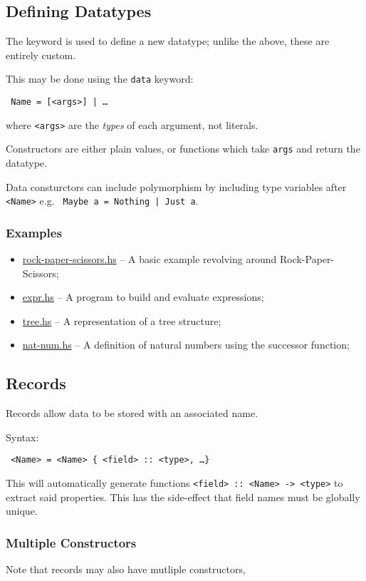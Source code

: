 \subsection{Defining Datatypes}
The  keyword is used to define a new datatype; unlike the above, these are entirely custom.

This may be done using the \texttt{data} keyword:
\begin{center}
  \texttt{ Name =  [<args>] | \ldots}
\end{center}
where \texttt{<args>} are the \textit{types} of each argument, not literals.

Constructors are either plain values, or functions which take \texttt{args} and return the datatype.

Data consturctors can include polymorphism by including type variables after \texttt{<Name>} e.g. \texttt{ Maybe a = Nothing | Just a}.

\subsubsection{Examples}
\begin{itemize}
  \item \url{rock-paper-scissors.hs} -- A basic example revolving around Rock-Paper-Scissors;
  \item \url{expr.hs} -- A program to build and evaluate expressions;
  \item \url{tree.hs} -- A representation of a tree structure;
  \item \url{nat-num.hs} -- A definition of natural numbers using the successor function;
\end{itemize}

\subsection{Records}
Records allow data to be stored with an associated name.

Syntax:
\begin{center}
  \texttt{ <Name> = <Name> \{ <field> :: <type>, \ldots \}}
\end{center}
This will automatically generate functions \texttt{<field> :: <Name> -> <type>} to extract said properties. This has the side-effect that field names must be globally unique.

\subsubsection{Multiple Constructors}
Note that records may also have mutliple constructors,

